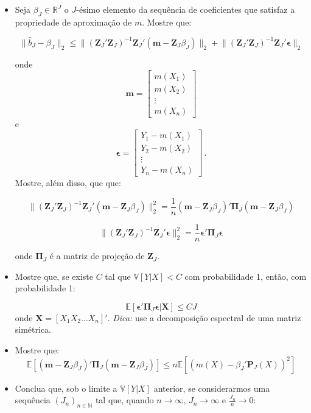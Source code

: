 \documentclass[10pt,a4paper]{article}
\begin{document}
 \begin{itemize}
 	\item[a] Seja $\beta_J \in \mathbb{R}^J$ o $J$-ésimo elemento da sequência de coeficientes que satisfaz a propriedade de aproximação de $m$. Mostre que:
 	
 	$$\lVert \hat{b}_{J} - \beta_J \rVert_2 \leq \lVert  (\boldsymbol{Z}_J'\boldsymbol{Z}_J)^{-1}\boldsymbol{Z}_J'\left(\boldsymbol{m} -\boldsymbol{Z}_J \beta_J\right)\rVert_2 + \lVert  (\boldsymbol{Z}_J'\boldsymbol{Z}_J)^{-1}\boldsymbol{Z}_J'\boldsymbol{\epsilon}\rVert_2$$ 
 	
 	onde $$\boldsymbol{m} = \begin{bmatrix}
 		m(X_1) \\
 		m(X_2) \\
 		\vdots \\
 		m(X_n)
 	\end{bmatrix}$$ e $$\boldsymbol{\epsilon} = \begin{bmatrix}
 		Y_1 - m(X_1)\\
 		Y_2 - m(X_2) \\
 		\vdots\\
 		Y_n - m(X_n)
 	\end{bmatrix}\, .$$ Mostre, além disso, que que:
 	\vspace{1em}
 	
 	$$\lVert  (\boldsymbol{Z}_J'\boldsymbol{Z}_J)^{-1}\boldsymbol{Z}_J'\left(\boldsymbol{m} -\boldsymbol{Z}_J \beta_J\right)\rVert_2^2  = \frac{1}{n}(\boldsymbol{m}-\boldsymbol{Z}_J\beta_J)'\boldsymbol{\Pi}_J(\boldsymbol{m}-\boldsymbol{Z}_J\beta_J)$$
 	
 	$$\lVert  (\boldsymbol{Z}_J'\boldsymbol{Z}_J)^{-1}\boldsymbol{Z}_J'\boldsymbol{\epsilon}\rVert_2^2  = \frac{1}{n}\boldsymbol{\epsilon}'\boldsymbol{\Pi}_J\boldsymbol{\epsilon}$$
 	
 	onde $\boldsymbol{\Pi}_J$ é a matriz de projeção de $\boldsymbol{Z}_J$.
 	\item[b]  Mostre que, se existe $C$ tal que $\mathbb{V}[Y|X] < C$ com probabilidade 1, então, com probabilidade 1:
 	
 	$$\mathbb{E}\left[\boldsymbol{\epsilon}'\boldsymbol{\Pi}_J \boldsymbol{\epsilon}|\boldsymbol{X}\right] \leq C J$$
 	onde $\boldsymbol{X} = [X_1 X_2 \ldots X_n]'$. \textit{Dica:} use  a decomposição espectral de uma matriz simétrica.
 	\item[c]  Mostre que:
 	$$\mathbb{E}[(\boldsymbol{m}-\boldsymbol{Z}_J\beta_J)'\boldsymbol{\Pi}_J(\boldsymbol{m}-\boldsymbol{Z}_J\beta_J)] \leq n \mathbb{E}[(m(X) - \beta_J'\boldsymbol{P}_J(X))^2]$$
 	\item[d]  Conclua que, sob o limite a $\mathbb{V}[Y|X]$ anterior, se considerarmos uma sequência $(J_n)_{n \in \mathbb{N}}$ tal que, quando $n \to \infty$, $J_n \to \infty$ e $\frac{J_n}{n} \to 0$:
 	

\end{itemize}
\end{document}
